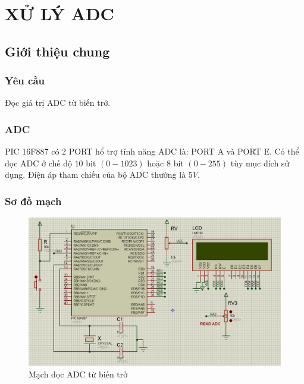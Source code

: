 \chapter{XỬ LÝ ADC}
\section{Giới thiệu chung}
\subsection{Yêu cầu}
Đọc giá trị ADC từ biến trở.
\subsection{ADC}
PIC 16F887 có 2 PORT hổ trợ tính năng ADC là: PORT A và PORT E. Có thể đọc ADC ở chế độ $10$ bit $\left({0-1023}\right)$ hoặc $8$ bit $\left({0-255}\right)$ tùy mục đích sử dụng. Điện áp tham chiếu của bộ ADC thường là $5V$.
\subsection{Sơ đồ mạch}
\begin{figure}[!h]
\begin{center}
\includegraphics[scale=0.5]{bai-4/image/BAI-4-1}
\end{center}
\caption{Mạch đọc ADC từ biến trở}
\end{figure}
